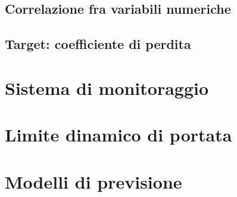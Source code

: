 \documentclass[fleqn,10pt]{SelfArx} %
\begin{document}
\subsection{Correlazione fra variabili numeriche}
\subsection{Target: coefficiente di perdita}
\section{Sistema di monitoraggio}
\section{Limite dinamico di portata}
\section{Modelli di previsione}



\end{document}
